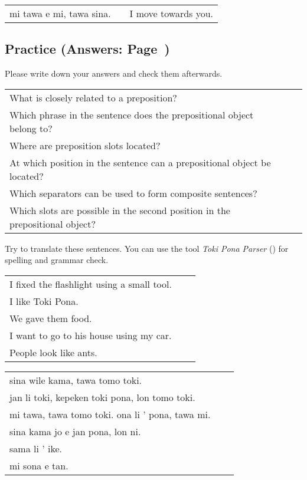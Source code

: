 \begin{supertabular}{p{5,5cm}|ll}
    mi tawa e mi, tawa sina. &  & I move towards you. \\
\end{supertabular}

\newpage

\subsection*{Practice (Answers: Page~\pageref{'prepositional_objects'})}
Please write down your answers and check them afterwards.

\begin{supertabular}{p{5,5cm}|ll}
    What is closely related to a preposition?                                    &  & \\
    Which phrase in the sentence does the prepositional object belong to?        &  & \\
    Where are preposition slots located?                                         &  & \\
    At which position in the sentence can a prepositional object be located?     &  & \\
    Which separators can be used to form composite sentences?                    &  & \\
    Which slots are possible in the second position in the prepositional object? &  & \\
\end{supertabular}

Try to translate these sentences.
You can use the tool \textit{Toki Pona Parser} (\cite{www:rowa:02}) for spelling and grammar check.

\begin{supertabular}{p{5,5cm}|ll}
    I fixed the flashlight using a small tool. &  & \\
    I like Toki Pona.                          &  & \\
    We gave them food.                         &  & \\
    I want to go to his house using my car.    &  & \\
    People look like ants.                     &  & \\
\end{supertabular}

\begin{supertabular}{p{5,5cm}|ll}
    sina wile kama, tawa tomo toki.                  &  & \\
    jan li toki, kepeken toki pona, lon tomo toki.   &  & \\
    mi tawa, tawa tomo toki. ona li ' pona, tawa mi. &  & \\
    sina kama jo e jan pona, lon ni.                 &  & \\
    sama li ' ike.                                   &  & \\
    mi sona e tan.                                   &  & \\
\end{supertabular}
